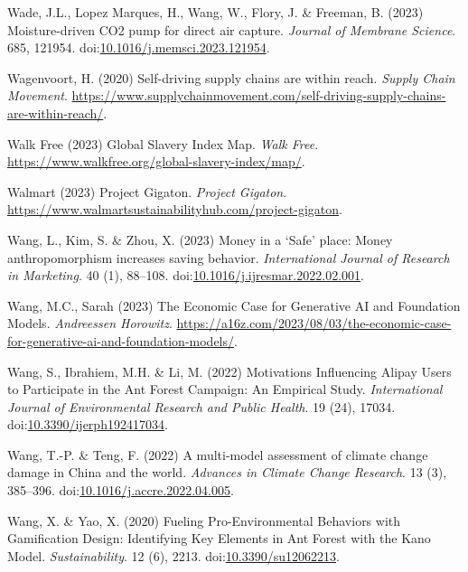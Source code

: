 \documentclass[
  letterpaper,
  DIV=11,
  numbers=noendperiod]{scrartcl}
\newlength{\cslhangindent}
\newenvironment{CSLReferences}[2] %
 {\begin{list}{}{%
  \setlength{\itemindent}{0pt}
  \setlength{\leftmargin}{0pt}
  \setlength{\parsep}{0pt}
  \ifodd #1
   \setlength{\leftmargin}{\cslhangindent}
   \setlength{\itemindent}{-1\cslhangindent}
  \fi
  \setlength{\itemsep}{#2\baselineskip}}}
 {\end{list}}
\begin{document}
\begin{CSLReferences}{0}{1}
Wade, J.L., Lopez Marques, H., Wang, W., Flory, J. \& Freeman, B. (2023)
Moisture-driven {CO2} pump for direct air capture. \emph{Journal of
Membrane Science}. 685, 121954.
doi:\href{https://doi.org/10.1016/j.memsci.2023.121954}{10.1016/j.memsci.2023.121954}.

Wagenvoort, H. (2020) Self-driving supply chains are within reach.
\emph{Supply Chain Movement}.
\url{https://www.supplychainmovement.com/self-driving-supply-chains-are-within-reach/}.

Walk Free (2023) Global {Slavery Index Map}. \emph{Walk Free}.
\url{https://www.walkfree.org/global-slavery-index/map/}.

Walmart (2023) {Project Gigaton}. \emph{Project Gigaton}.
\url{https://www.walmartsustainabilityhub.com/project-gigaton}.

Wang, L., Kim, S. \& Zhou, X. (2023) Money in a {`{Safe}'} place:
{Money} anthropomorphism increases saving behavior. \emph{International
Journal of Research in Marketing}. 40 (1), 88--108.
doi:\href{https://doi.org/10.1016/j.ijresmar.2022.02.001}{10.1016/j.ijresmar.2022.02.001}.

Wang, M.C., Sarah (2023) The {Economic Case} for {Generative AI} and
{Foundation Models}. \emph{Andreessen Horowitz}.
\url{https://a16z.com/2023/08/03/the-economic-case-for-generative-ai-and-foundation-models/}.

Wang, S., Ibrahiem, M.H. \& Li, M. (2022) Motivations {Influencing
Alipay Users} to {Participate} in the {Ant Forest Campaign}: {An
Empirical Study}. \emph{International Journal of Environmental Research
and Public Health}. 19 (24), 17034.
doi:\href{https://doi.org/10.3390/ijerph192417034}{10.3390/ijerph192417034}.

Wang, T.-P. \& Teng, F. (2022) A multi-model assessment of climate
change damage in {China} and the world. \emph{Advances in Climate Change
Research}. 13 (3), 385--396.
doi:\href{https://doi.org/10.1016/j.accre.2022.04.005}{10.1016/j.accre.2022.04.005}.

Wang, X. \& Yao, X. (2020) Fueling {Pro-Environmental Behaviors} with
{Gamification Design}: {Identifying Key Elements} in {Ant Forest} with
the {Kano Model}. \emph{Sustainability}. 12 (6), 2213.
doi:\href{https://doi.org/10.3390/su12062213}{10.3390/su12062213}.


\end{CSLReferences}
\end{document}

